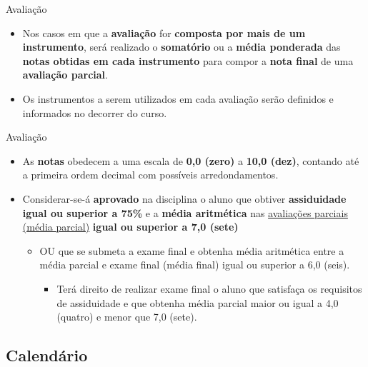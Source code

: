 \documentclass{beamer}
\begin{document}
\begin{frame}{Avaliação}
    \begin{itemize}
        \justifying
        \item Nos casos em que a \textbf{avaliação} for \textbf{composta por mais de um instrumento}, será realizado o \textbf{somatório} ou a \textbf{média ponderada} das \textbf{notas obtidas em cada instrumento} para compor a \textbf{nota final} de uma \textbf{avaliação parcial}.
        \item Os instrumentos a serem utilizados em cada avaliação serão definidos e informados no decorrer do curso.
    \end{itemize}
\end{frame}

\begin{frame}{Avaliação}
    \begin{itemize}
        \justifying
        \item As \textbf{notas} obedecem a uma escala de \textbf{0,0 (zero)} a \textbf{10,0 (dez)}, contando até a primeira ordem decimal com possíveis arredondamentos.
        \item Considerar-se-á \textbf{aprovado} na disciplina o aluno que obtiver \textbf{assiduidade igual ou superior a 75\%} e a \textbf{média aritmética} nas \underline{avaliações parciais (média parcial)} \textbf{igual ou superior a 7,0 (sete)}
        \begin{itemize}
            \justifying
            \item OU que se submeta a \alert<2>{exame final} e obtenha média aritmética entre a média parcial e exame final (média final) igual ou superior a 6,0 (seis).
            \begin{itemize}
                \justifying
                \item<2> Terá direito de realizar exame final o aluno que satisfaça os requisitos de assiduidade e que obtenha média parcial maior ou igual a 4,0 (quatro) e menor que 7,0 (sete).
            \end{itemize}
        \end{itemize}
    \end{itemize}
\end{frame}

\subsection{Calendário}
\end{document}
